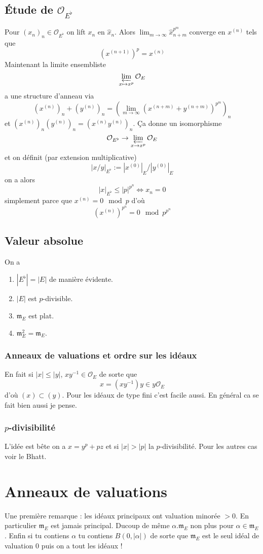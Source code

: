 \documentclass[a4paper,12pt]{article}
\newcommand{\Or}{\mathcal{O}}
\newcommand{\m}{\mathfrak m}
\theoremstyle{plain}
\theoremstyle{definition}
\theoremstyle{remark}
\begin{document}
\subsection{Étude de $\Or_{E^\flat}$}
Pour $(x_n)_n\in \Or_{E^\flat}$ on lift $x_n$ en $\widehat x_n$.
Alors $\lim_{m\to \infty} \widehat x_{n+m}^{p^m}$ converge en
$x^{(n)}$ tels que 
\[(x^{(n+1)})^p=x^{(n)}\]
Maintenant la limite ensembliste
\[\varprojlim_{x\mapsto x^p}\Or_E\]
a une structure d'anneau via \[(x^{(n)})_n+(y^{(n)})_n=(\lim_{m\to\infty} (x^{(n+m)}+y^{(n+m)})^{p^m})_n\]
et $(x^{(n)})_n(y^{(n)})_n=(x^{(n)}y^{(n)})_n$. Ça donne
un isomorphisme
\[\Or_{E^\flat}\to \varprojlim_{x\to x^p}\Or_E\]
et on définit (par extension multiplicative)
\[|x/y|_{E^\flat}:=|x^{(0)}|_E/|y^{(0)}|_E\]
on a alors
\[|x|_{E^\flat}\leq |p|^{p^n}\Leftrightarrow x_n=0\]
simplement parce que $x^{(n)}=0\mod p$ d'où
\[(x^{(n)})^{p^n}=0\mod p^{p^n}\]

\subsection{Valeur absolue}
On a 
\begin{enumerate}
    \item $|E^\flat|=|E|$ de manière évidente.
    \item $|E|$ est $p$-divisible.
    \item $\m_E$ est plat.
    \item $\m_E^2=\m_E$.
\end{enumerate}
\subsubsection{Anneaux de valuations et ordre sur les idéaux}
En fait si $|x|\leq |y|$, $xy^{-1}\in\Or_{E}$ de sorte que 
\[x=(xy^{-1})y\in y\Or_E\]
d'où $(x)\subset (y)$. Pour les idéaux de type fini c'est facile
aussi. En général ca se fait bien aussi je pense. 

\subsubsection{$p$-divisibilité}
L'idée est bête on a $x=y^p+pz$ et si $|x|>|p|$ la 
$p$-divisibilité. Pour les autres cas voir le Bhatt.



\section{Anneaux de valuations}
Une première remarque : les idéaux principaux ont valuation
minorée $>0$. En particulier $\m_E$ est jamais principal. Ducoup
de même $\alpha.\m_E$ non plus pour $\alpha\in \m_E$. Enfin si
tu contiens $\alpha$ tu contiens $B(0, |\alpha|)$ de sorte que
$\m_E$ est le seul idéal de valuation $0$ puis on a tout les
idéaux !
\end{document}
